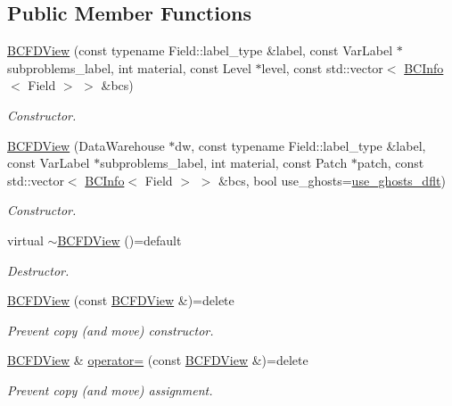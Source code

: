 \subsection*{Public Member Functions}
\begin{DoxyCompactItemize}
\item 
\hyperlink{classUintah_1_1PhaseField_1_1BCFDView_ad4373326efd0b7c9cbe0c6dc3ad47c20}{B\+C\+F\+D\+View} (const typename Field\+::label\+\_\+type \&label, const Var\+Label $\ast$subproblems\+\_\+label, int material, const Level $\ast$level, const std\+::vector$<$ \hyperlink{structUintah_1_1PhaseField_1_1BCInfo}{B\+C\+Info}$<$ Field $>$ $>$ \&bcs)
\begin{DoxyCompactList}\small\item\em Constructor. \end{DoxyCompactList}\item 
\hyperlink{classUintah_1_1PhaseField_1_1BCFDView_a6d8ec6f7ffa8f5fd672d73c4688124ee}{B\+C\+F\+D\+View} (Data\+Warehouse $\ast$dw, const typename Field\+::label\+\_\+type \&label, const Var\+Label $\ast$subproblems\+\_\+label, int material, const Patch $\ast$patch, const std\+::vector$<$ \hyperlink{structUintah_1_1PhaseField_1_1BCInfo}{B\+C\+Info}$<$ Field $>$ $>$ \&bcs, bool use\+\_\+ghosts=\hyperlink{classUintah_1_1PhaseField_1_1BCFDView_a7746f0ab792c1d5201e8917409fab236}{use\+\_\+ghosts\+\_\+dflt})
\begin{DoxyCompactList}\small\item\em Constructor. \end{DoxyCompactList}\item 
virtual \hyperlink{classUintah_1_1PhaseField_1_1BCFDView_aea8c208f40a8962423afa58cea2b8d6c}{$\sim$\+B\+C\+F\+D\+View} ()=default
\begin{DoxyCompactList}\small\item\em Destructor. \end{DoxyCompactList}\item 
\hyperlink{classUintah_1_1PhaseField_1_1BCFDView_ad31cc98a6bd0db4f3df038bae6c62415}{B\+C\+F\+D\+View} (const \hyperlink{classUintah_1_1PhaseField_1_1BCFDView}{B\+C\+F\+D\+View} \&)=delete
\begin{DoxyCompactList}\small\item\em Prevent copy (and move) constructor. \end{DoxyCompactList}\item 
\hyperlink{classUintah_1_1PhaseField_1_1BCFDView}{B\+C\+F\+D\+View} \& \hyperlink{classUintah_1_1PhaseField_1_1BCFDView_aaa28c532b707463797e7a498a3830a81}{operator=} (const \hyperlink{classUintah_1_1PhaseField_1_1BCFDView}{B\+C\+F\+D\+View} \&)=delete
\begin{DoxyCompactList}\small\item\em Prevent copy (and move) assignment. \end{DoxyCompactList}\end{DoxyCompactItemize}
